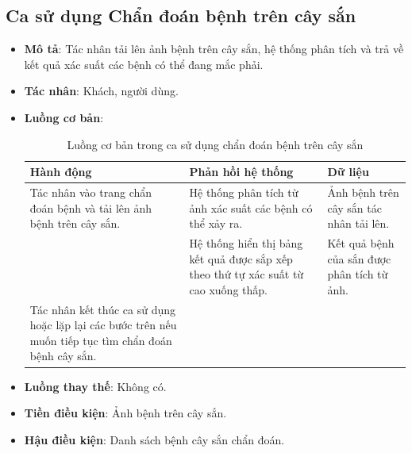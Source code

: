 \documentclass[./../main.tex]{subfiles}
\begin{document}
\subsection{Ca sử dụng Chẩn đoán bệnh trên cây sắn}
\begin{itemize}
    \item \textbf{Mô tả}: Tác nhân tải lên ảnh bệnh trên cây sắn, hệ thống phân tích và trả về kết quả xác suất các bệnh có thể đang mắc phải.
    \item \textbf{Tác nhân}: Khách, người dùng.
    \item \textbf{Luồng cơ bản}:
    \begin{table}[H]
    \caption{\label{uc-32}Luồng cơ bản trong ca sử dụng chẩn đoán bệnh trên cây sắn}
    \begin{tabularx}{\textwidth}{| X | X | X |}
        \hline
        \textbf{Hành động} & \textbf{Phản hồi hệ thống} & \textbf{Dữ liệu} 
        \\ \hline
        Tác nhân vào trang chẩn đoán bệnh và tải lên ảnh bệnh trên cây sắn. & Hệ thống phân tích từ ảnh xác suất các bệnh có thể xảy ra. & Ảnh bệnh trên cây sắn tác nhân tải lên.
        \\ \hline
        & Hệ thống hiển thị bảng kết quả được sắp xếp theo thứ tự xác suất từ cao xuống thấp. & Kết quả bệnh của sắn được phân tích từ ảnh.
        \\ \hline
        Tác nhân kết thúc ca sử dụng hoặc lặp lại các bước trên nếu muốn tiếp tục tìm chẩn đoán bệnh cây sắn. & &
        \\ \hline
    \end{tabularx}
    \end{table}    
    \item \textbf{Luồng thay thế}: Không có.
    \item \textbf{Tiền điều kiện}: Ảnh bệnh trên cây sắn.
    \item \textbf{Hậu điều kiện}: Danh sách bệnh cây sắn chẩn đoán.
\end{itemize}
\end{document}
